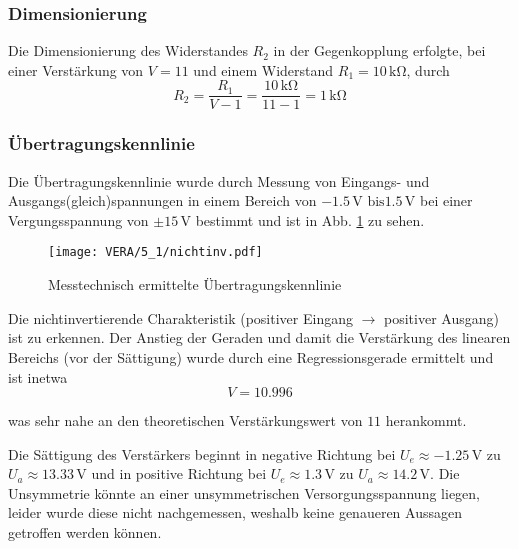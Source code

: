 \subsubsection{Dimensionierung}
Die Dimensionierung des Widerstandes $R_2$ in der Gegenkopplung erfolgte, bei
einer Verstärkung von $V = 11$ und einem Widerstand $R_1 = 10 \, \si{\kilo\ohm}$, durch
\[R_2 = \frac{R_1}{V - 1} = \frac{10 \, \si{\kilo\ohm}}{11 - 1} = 1 \, \si{\kilo\ohm}\]

\subsubsection{Übertragungskennlinie}
Die Übertragungskennlinie wurde durch Messung von Eingangs- und
Ausgangs(gleich)spannungen in einem Bereich von $-1.5 \, \si{\volt} \textrm{ bis
} 1.5 \, \si{\volt}$ bei einer Vergungsspannung von $\pm 15 \, \si{\volt}$ bestimmt und ist in Abb. \ref{fig:noninv} zu sehen.

\begin{figure}[H]
  \begin{center}
    \texttt{[image: VERA/5\_1/nichtinv.pdf]}
  \end{center}
  \caption{Messtechnisch ermittelte Übertragungskennlinie}
  \label{fig:noninv}
\end{figure}

Die nichtinvertierende Charakteristik (positiver Eingang $\rightarrow$ positiver
Ausgang) ist zu erkennen. Der Anstieg der Geraden und damit die Verstärkung des
linearen Bereichs (vor der Sättigung) wurde durch eine Regressionsgerade
ermittelt und ist inetwa
\[V = 10.996\]

was sehr nahe an den theoretischen Verstärkungswert von $11$ herankommt.

Die Sättigung des Verstärkers beginnt in negative Richtung bei $U_e \approx
-1.25 \, \si{\volt}$ zu $U_a \approx 13.33 \, \si{\volt}$ und in positive
Richtung bei $U_e \approx 1.3 \, \si{\volt}$ zu $U_a \approx 14.2 \, \si{\volt}$.
Die Unsymmetrie könnte an einer unsymmetrischen Versorgungsspannung liegen,
leider wurde diese nicht nachgemessen, weshalb keine genaueren Aussagen getroffen
werden können.

\vspace{0.03444\paperheight}


